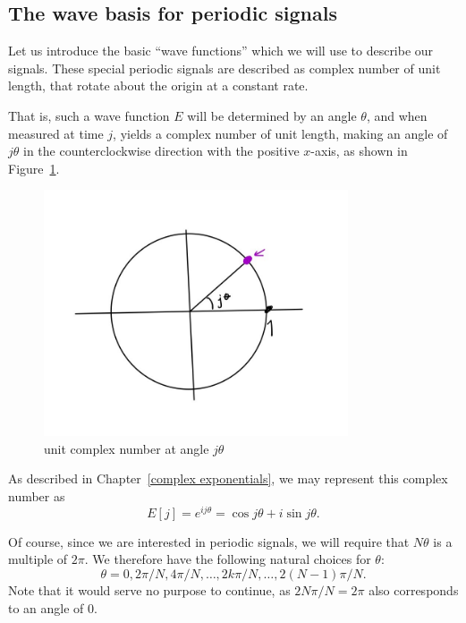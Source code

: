 \documentclass[12pt]{report}
\theoremstyle{plain}
\begin{document}
\subsection{The wave basis for periodic signals}
Let us introduce the basic ``wave functions'' which we will use to describe our signals. These special periodic signals are described as complex number of unit length, that rotate about the origin at a constant rate.

That is, such a wave function $E$ will be determined by an angle $\theta$, and when measured at time $j$, yields a complex number of unit length, making an angle of $j\theta$ in the counterclockwise direction with the positive $x$-axis, as shown in Figure~\ref{jtheta}.

\begin{figure}[ht!]
\centering
\includegraphics[width=90mm]{jtheta.jpg}
\caption{unit complex number at angle $j \theta$ \label{jtheta}}
\end{figure}

As described in Chapter~\ref{complex exponentials}, we may represent this complex number as
\[E[j] = e^{ij\theta} = \cos{j\theta} + i \sin{j \theta}.\]

Of course, since we are interested in periodic signals, we will require that $N\theta$ is a multiple of $2\pi$. We therefore have the following natural choices for $\theta$:
\[\theta = 0, 2 \pi/N, 4 \pi / N, \ldots, 2k\pi/N, \ldots, 2(N-1)\pi/N.\]
Note that it would serve no purpose to continue, as $2N\pi/N = 2\pi$ also corresponds to an angle of $0$.
\end{document}
